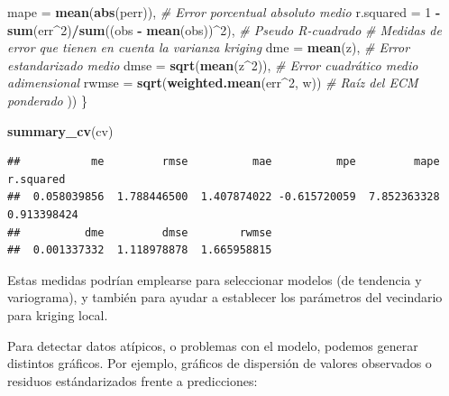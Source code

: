 \documentclass[
]{book}
\newenvironment{Shaded}{\begin{snugshade}}{\end{snugshade}}
\newcommand{\AttributeTok}[1]{\textcolor[rgb]{0.13,0.29,0.53}{#1}}
\newcommand{\CommentTok}[1]{\textcolor[rgb]{0.56,0.35,0.01}{\textit{#1}}}
\newcommand{\DecValTok}[1]{\textcolor[rgb]{0.00,0.00,0.81}{#1}}
\newcommand{\FunctionTok}[1]{\textcolor[rgb]{0.13,0.29,0.53}{\textbf{#1}}}
\newcommand{\NormalTok}[1]{#1}
\newcommand{\SpecialCharTok}[1]{\textcolor[rgb]{0.81,0.36,0.00}{\textbf{#1}}}
\theoremstyle{break}
\theoremstyle{definition}
\theoremstyle{definition}
\theoremstyle{definition}
\theoremstyle{definition}
\theoremstyle{remark}
\begin{document}
\begin{Shaded}
\begin{Highlighting}[]
    \AttributeTok{mape =} \FunctionTok{mean}\NormalTok{(}\FunctionTok{abs}\NormalTok{(perr)),   }\CommentTok{\# Error porcentual absoluto medio}
    \AttributeTok{r.squared =} \DecValTok{1} \SpecialCharTok{{-}} \FunctionTok{sum}\NormalTok{(err}\SpecialCharTok{\^{}}\DecValTok{2}\NormalTok{)}\SpecialCharTok{/}\FunctionTok{sum}\NormalTok{((obs }\SpecialCharTok{{-}} \FunctionTok{mean}\NormalTok{(obs))}\SpecialCharTok{\^{}}\DecValTok{2}\NormalTok{), }\CommentTok{\# Pseudo R{-}cuadrado}
    \CommentTok{\# Medidas de error que tienen en cuenta la varianza kriging}
    \AttributeTok{dme =} \FunctionTok{mean}\NormalTok{(z),            }\CommentTok{\# Error estandarizado medio}
    \AttributeTok{dmse =} \FunctionTok{sqrt}\NormalTok{(}\FunctionTok{mean}\NormalTok{(z}\SpecialCharTok{\^{}}\DecValTok{2}\NormalTok{)),    }\CommentTok{\# Error cuadrático medio adimensional}
    \AttributeTok{rwmse =} \FunctionTok{sqrt}\NormalTok{(}\FunctionTok{weighted.mean}\NormalTok{(err}\SpecialCharTok{\^{}}\DecValTok{2}\NormalTok{, w)) }\CommentTok{\# Raíz del ECM ponderado}
\NormalTok{  ))}
\NormalTok{\}}

\FunctionTok{summary\_cv}\NormalTok{(cv)}
\end{Highlighting}
\end{Shaded}

\begin{verbatim}
##           me         rmse          mae          mpe         mape    r.squared 
##  0.058039856  1.788446500  1.407874022 -0.615720059  7.852363328  0.913398424 
##          dme         dmse        rwmse 
##  0.001337332  1.118978878  1.665958815
\end{verbatim}

Estas medidas podrían emplearse para seleccionar modelos (de tendencia y variograma), y también para ayudar a establecer los parámetros del vecindario para kriging local.

Para detectar datos atípicos, o problemas con el modelo, podemos generar distintos gráficos.
Por ejemplo, gráficos de dispersión de valores observados o residuos estándarizados frente a predicciones:
\end{document}
